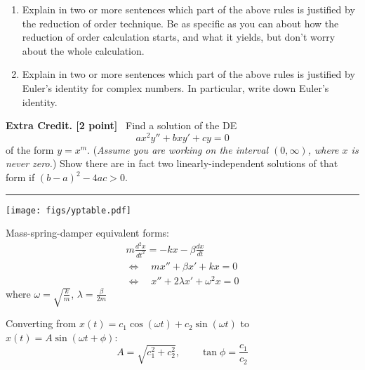 \documentclass[12pt]{article}
\renewcommand{\emph}[1]{\textsf{\textbf{#1}}}
\newcounter{probcount}
\newcounter{subprobcount}
\newenvironment{subproblems}{%
\begin{enumerate}[itemindent=8pt,leftmargin=0pt]%
\setcounter{enumi}{\value{subprobcount}}%
\renewcommand{\labelenumi}{\emph{\textsl{\alph{enumi})}} \,}%
}%
{%
\setcounter{subprobcount}{\value{enumi}}%
\end{enumerate}%
}
\newcommand{\ds}{\displaystyle}
\begin{document}
\begin{subproblems}
\item Explain in two or more sentences which part of the above rules is justified by the reduction of order technique.  Be as specific as you can about how the reduction of order calculation starts, and what it yields, but don't worry about the whole calculation.
\vfill

\item Explain in two or more sentences which part of the above rules is justified by Euler's identity for complex numbers.  In particular, write down Euler's identity.
\vfill
\end{subproblems}


\clearpage\newpage
\noindent \emph{Extra Credit. [2 point]} \, Find a solution of the DE
    $$ax^2y'' + bxy' + cy = 0$$
of the form $y=x^m$.  (\textsl{Assume you are working on the interval $(0,\infty)$, where $x$ is never zero.})  Show there are in fact two linearly-independent solutions of that form if $(b-a)^2 - 4 a c > 0$.
\vfill


\noindent \hrule
\medskip
\begin{minipage}[t]{0.6\textwidth}\vspace{0pt}%
\texttt{[image: figs/yptable.pdf]}
\end{minipage}
\begin{minipage}[t]{0.4\textwidth}
\phantom{foo}

Mass-spring-damper equivalent forms:
\begin{gather*}
m \frac{d^2x}{dt^2} = -kx -\beta \frac{dx}{dt} \\
\iff \quad m x'' + \beta x' + k x = 0 \\
\iff \quad x'' + 2\lambda x' + \omega^2 x = 0
\end{gather*}
where \quad $\ds\omega = \sqrt{\frac{k}{m}}$, \quad $\ds\lambda = \frac{\beta}{2m}$
\end{minipage}

\bigskip
Converting from $x(t) = c_1 \cos(\omega t) + c_2 \sin(\omega t)$ to $x(t) = A \sin(\omega t + \phi)$:
	$$A = \sqrt{c_1^2 + c_2^2}, \qquad \tan\phi = \frac{c_1}{c_2}$$
\end{document}
